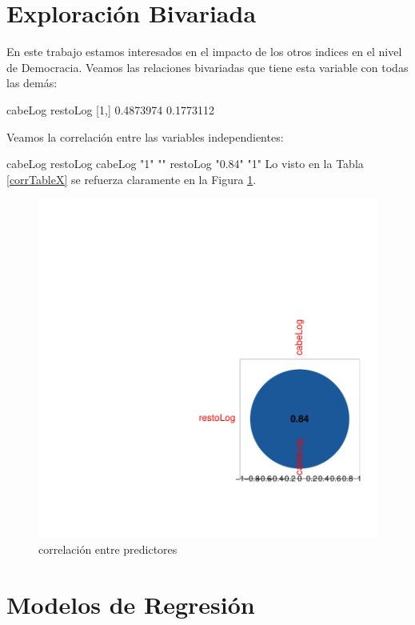 \documentclass{article}
\begin{document}
\section{Exploraci\'on Bivariada}

En este trabajo estamos interesados en el impacto de los otros indices en el nivel de Democracia. Veamos las relaciones bivariadas que tiene esta variable con todas las dem\'as:

       cabeLog  restoLog
[1,] 0.4873974 0.1773112

Veamos la correlaci\'on entre las variables independientes:


         cabeLog restoLog
cabeLog  "1"     ""      
restoLog "0.84"  "1"     
Lo visto en la Tabla \ref{corrTableX} se refuerza claramente en la Figura \ref{corrPlotX}.

\begin{figure}[h]
\centering
\begin{adjustbox}{width=7cm,height=7cm,clip,trim=1.5cm 0.5cm 0cm 1.5cm}

\includegraphics{FinaldeR-corrPlotX}
\end{adjustbox}
\caption{correlaci\'on entre predictores}
\label{corrPlotX}
\end{figure}


\clearpage

\section{Modelos de Regresi\'on}
\end{document}
